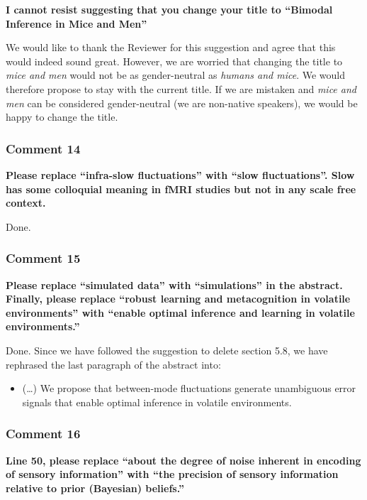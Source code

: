\documentclass[
]{article}
\providecommand{\tightlist}{%
  \setlength{\itemsep}{0pt}\setlength{\parskip}{0pt}}
\begin{document}
\textbf{I cannot resist suggesting that you change your title to
``Bimodal Inference in Mice and Men''}

We would like to thank the Reviewer for this suggestion and agree that
this would indeed sound great. However, we are worried that changing the
title to \emph{mice and men} would not be as gender-neutral as
\emph{humans and mice}. We would therefore propose to stay with the
current title. If we are mistaken and \emph{mice and men} can be
considered gender-neutral (we are non-native speakers), we would be
happy to change the title.

\hypertarget{comment-14}{%
\subsubsection{Comment 14}\label{comment-14}}

\textbf{Please replace ``infra-slow fluctuations'' with ``slow
fluctuations''. Slow has some colloquial meaning in fMRI studies but not
in any scale free context.}

Done.

\hypertarget{comment-15}{%
\subsubsection{Comment 15}\label{comment-15}}

\textbf{Please replace ``simulated data'' with ``simulations'' in the
abstract. Finally, please replace ``robust learning and metacognition in
volatile environments'' with ``enable optimal inference and learning in
volatile environments.''}

Done. Since we have followed the suggestion to delete section 5.8, we
have rephrased the last paragraph of the abstract into:

\begin{itemize}
\tightlist
\item
  (\ldots) We propose that between-mode fluctuations generate
  unambiguous error signals that enable optimal inference in volatile
  environments.
\end{itemize}

\hypertarget{comment-16}{%
\subsubsection{Comment 16}\label{comment-16}}

\textbf{Line 50, please replace ``about the degree of noise inherent in
encoding of sensory information'' with ``the precision of sensory
information relative to prior (Bayesian) beliefs.''}
\end{document}

